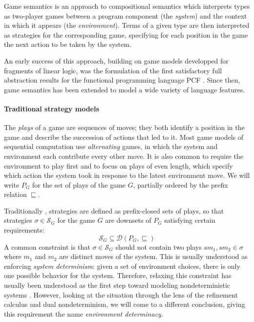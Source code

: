 \documentclass[sigplan,10pt,review,anonymous]{acmart}
\begin{document}
Game semantics is an approach to compositional semantics
which interprets types as two-player games
between a program component (the \emph{system})
and the context in which it appears (the \emph{environment}).
Terms of a given type are then interpreted as
strategies for the corresponding game,
specifying for each position in the game
the next action to be taken by the system.

An early success of this approach,
building on game models developped for
fragments of linear logic,
was the formulation of the first satisfactory
full abstraction results
for the functional programming language PCF \cite{pcfajm,pcfho}.
Since then,
game semantics has been extended to
model a wide variety of language features.

\paragraph{Traditional strategy models} %

The \emph{plays} of a game are sequences of moves;
they both identify a position in the game
and describe the succession of actions that led to it.
Most game models of sequential computation
use \emph{alternating} games,
in which
the system and environment each contribute
every other move.
It is also common to require the environment to play first
and to focus on plays of even length,
which specify which action the system took
in response to the latest environment move.
We will write $P_G$ for the set of plays of the game $G$,
partially ordered by the prefix relation $\sqsubseteq$.

Traditionally \cite{gamesem99},
strategies are defined as
prefix-closed sets of plays,
so that strategies $\sigma \in \mathcal{S}_G$
for the game $G$ are downsets of $P_G$
satisfying certain requirements:
\[
    \mathcal{S}_G \subseteq
    \mathcal{D}(P_G, {\sqsubseteq})
\]
A common constraint is that $\sigma \in \mathcal{S}_G$
should not contain two plays $s m_1, s m_2 \in \sigma$
where $m_1$ and $m_2$ are distinct moves of the system.
This is usually understood as
enforcing \emph{system determinism}:
given a set of environment choices,
there is only one possible behavior for the system.
Therefore,
relaxing this constraint has usually been understood
as the first step toward modeling nondeterministic systems
\cite{gsfnd}.
However,
looking at the situation through the lens of
the refinement calculus and dual nondeterminism,
we will come to a different conclusion,
giving this requirement the name
\emph{environment determinacy}.
\end{document}
